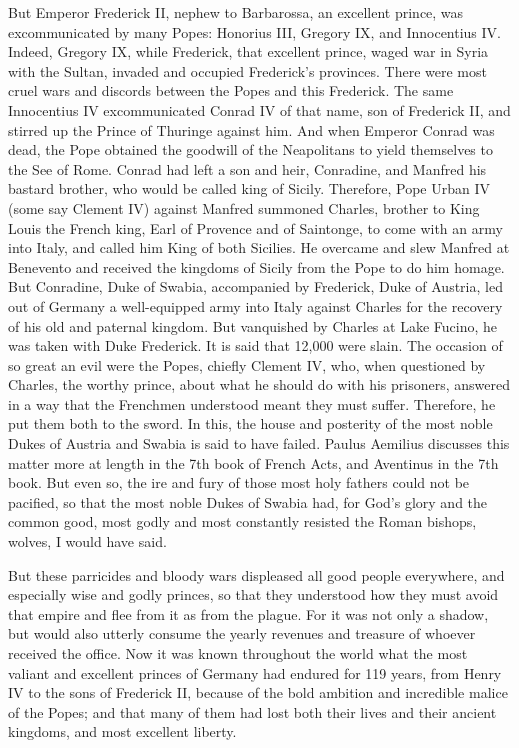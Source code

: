 But Emperor Frederick II, nephew to Barbarossa, an excellent prince, was excommunicated by many Popes: Honorius III, Gregory IX, and Innocentius IV. Indeed, Gregory IX, while Frederick, that excellent prince, waged war in Syria with the Sultan, invaded and occupied Frederick’s provinces. There were most cruel wars and discords between the Popes and this Frederick. The same Innocentius IV excommunicated Conrad IV of that name, son of Frederick II, and stirred up the Prince of Thuringe against him. And when Emperor Conrad was dead, the Pope obtained the goodwill of the Neapolitans to yield themselves to the See of Rome. Conrad had left a son and heir, Conradine, and Manfred his bastard brother, who would be called king of Sicily. Therefore, Pope Urban IV (some say Clement IV) against Manfred summoned Charles, brother to King Louis the French king, Earl of Provence and of Saintonge, to come with an army into Italy, and called him King of both Sicilies. He overcame and slew Manfred at Benevento and received the kingdoms of Sicily from the Pope to do him homage. But Conradine, Duke of Swabia, accompanied by Frederick, Duke of Austria, led out of Germany a well-equipped army into Italy against Charles for the recovery of his old and paternal kingdom. But vanquished by Charles at Lake Fucino, he was taken with Duke Frederick. It is said that 12,000 were slain. The occasion of so great an evil were the Popes, chiefly Clement IV, who, when questioned by Charles, the worthy prince, about what he should do with his prisoners, answered in a way that the Frenchmen understood meant they must suffer. Therefore, he put them both to the sword. In this, the house and posterity of the most noble Dukes of Austria and Swabia is said to have failed. Paulus Aemilius discusses this matter more at length in the 7th book of French Acts, and Aventinus in the 7th book. But even so, the ire and fury of those most holy fathers could not be pacified, so that the most noble Dukes of Swabia had, for God’s glory and the common good, most godly and most constantly resisted the Roman bishops, wolves, I would have said.

But these parricides and bloody wars displeased all good people everywhere, and especially wise and godly princes, so that they understood how they must avoid that empire and flee from it as from the plague. For it was not only a shadow, but would also utterly consume the yearly revenues and treasure of whoever received the office. Now it was known throughout the world what the most valiant and excellent princes of Germany had endured for 119 years, from Henry IV to the sons of Frederick II, because of the bold ambition and incredible malice of the Popes; and that many of them had lost both their lives and their ancient kingdoms, and most excellent liberty.

